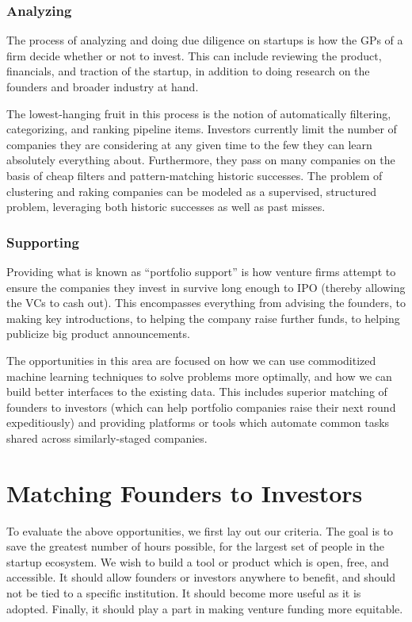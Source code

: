 \subsubsection{Analyzing}

The process of analyzing and doing due diligence on startups is how the GPs of a firm decide whether or not to invest. This can include reviewing the product, financials, and traction of the startup, in addition to doing research on the founders and broader industry at hand.

The lowest-hanging fruit in this process is the notion of automatically filtering, categorizing, and ranking pipeline items. Investors currently limit the number of companies they are considering at any given time to the few they can learn absolutely everything about. Furthermore, they pass on many companies on the basis of cheap filters and pattern-matching historic successes. The problem of clustering and raking companies can be modeled as a supervised, structured problem, leveraging both historic successes as well as past misses.

\subsubsection{Supporting}

Providing what is known as ``portfolio support'' is how venture firms attempt to ensure the companies they invest in survive long enough to IPO (thereby allowing the VCs to cash out). This encompasses everything from advising the founders, to making key introductions, to helping the company raise further funds, to helping publicize big product announcements.

The opportunities in this area are focused on how we can use commoditized machine learning techniques to solve problems more optimally, and how we can build better interfaces to the existing data. This includes superior matching of founders to investors (which can help portfolio companies raise their next round expeditiously) and providing platforms or tools which automate common tasks shared across similarly-staged companies.

\section{Matching Founders to Investors}

To evaluate the above opportunities, we first lay out our criteria. The goal is to save the greatest number of hours possible, for the largest set of people in the startup ecosystem. We wish to build a tool or product which is open, free, and accessible. It should allow founders or investors anywhere to benefit, and should not be tied to a specific institution. It should become more useful as it is adopted. Finally, it should play a part in making venture funding more equitable.

